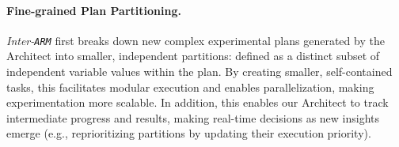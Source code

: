 \paragraph{Fine-grained Plan Partitioning.}
\textit{Inter-\texttt{ARM}} first breaks down new complex experimental plans generated by the Architect into smaller, independent partitions: defined as a distinct subset of independent variable values within the plan. 
By creating smaller, self-contained tasks, this facilitates modular execution and enables parallelization, making experimentation more scalable. 
In addition, this enables our Architect to track intermediate progress and results, making real-time decisions as new insights emerge (e.g., reprioritizing partitions by updating their execution priority).

